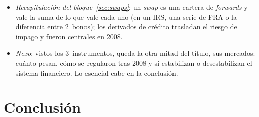 \documentclass[11pt]{article}
\begin{document}
\begin{itemize}
\item \emph{Recapitulación del bloque~\ref{sec:swaps}}: un \emph{swap} es una cartera de \emph{forwards} y vale la suma de lo que vale cada uno (en un IRS, una serie de FRA o la diferencia entre 2~bonos); los derivados de crédito trasladan el riesgo de impago y fueron centrales en 2008.
\item \emph{Nexo}: vistos los 3~instrumentos, queda la otra mitad del título, sus mercados: cuánto pesan, cómo se regularon tras 2008 y si estabilizan o desestabilizan el sistema financiero. Lo esencial cabe en la conclusión.
\end{itemize}

\section*{Conclusión}
\end{document}
